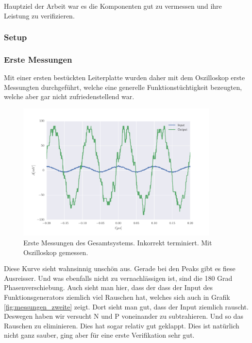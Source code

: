 
Hauptziel der Arbeit war es die Komponenten gut zu vermessen und ihre Leistung zu verifizieren.

\subsubsection*{Setup}

\subsubsection*{Erste Messungen}

Mit einer ersten bestückten Leiterplatte wurden daher mit dem Oszilloskop erste Messungten durchgeführt, welche eine generelle Funktionstüchtigkeit bezeugten, welche aber gar nicht zufriedenstellend war.

\begin{figure}[ht]
\begin{center}
    \includegraphics[width=0.9\textwidth]{data/images/messungen/erste_messung}
    \caption{Erste Messungen des Gesamtsystems. Inkorrekt terminiert. Mit Oszilloskop gemessen.}
    \label{fig:messungen_erste}
\end{center}
\end{figure}

Diese Kurve sieht wahnsinnig unschön aus. Gerade bei den Peaks gibt es fiese Ausreisser. Und was ebenfalls nicht zu vernachlässigen ist, sind die 180 Grad Phasenverschiebung.
Auch sieht man hier, dass der dass der Input des Funktionsgenerators ziemlich viel Rauschen hat, welches sich auch in Grafik \ref{fig:messungen_zweite} zeigt.
Dort sieht man gut, dass der Input ziemlich rauscht. Deswegen haben wir versucht N und P voneinander zu subtrahieren. Und so das Rauschen zu eliminieren. Dies hat sogar relativ gut geklappt. Dies ist natürlich nicht ganz sauber, ging aber für eine erste Verifikation sehr gut.

